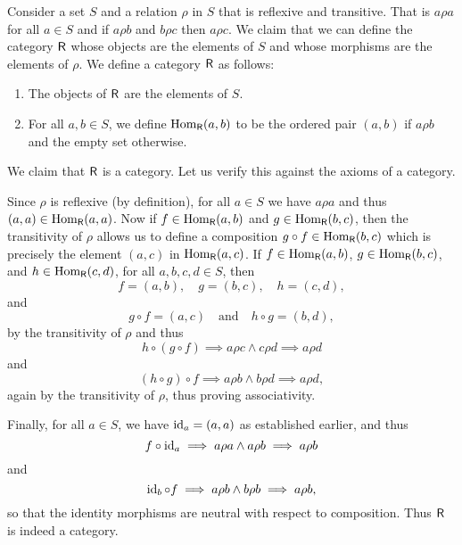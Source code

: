 \begin{example}
    Consider a set \(S\) and a relation \(\rho\) in \(S\) that is reflexive and
    transitive. That is \(a\rho a\) for all \(a \in S\) and if \(a\rho b\) and
    \(b\rho c\) then \(a\rho c\). We claim that we can define the category
    \(\mathsf{R}\) whose objects are the elements of \(S\) and whose morphisms are
    the elements of \(\rho\). We define a category \(\mathsf{R}\) as follows:
    \begin{enumerate}[label=(\alph*), itemsep=0pt]
        \item The objects of \(\mathsf{R}\) are the elements of \(S\).
        \item For all \(a, b \in S\), we define \(\operatorname{Hom}_{\mathsf{R}}(a, b)\) to be
        the ordered pair \((a, b)\) if \(a\rho b\) and the empty set otherwise.
    \end{enumerate}
    We claim that \(\mathsf{R}\) is a category. Let us verify this against the
    axioms of a category.

    Since \(\rho\) is reflexive (by definition), for all \(a \in S\) we have
    \(a\rho a\) and thus \((a, a) \in \operatorname{Hom}_{\mathsf{R}}(a, a)\). Now if \(f \in
    \operatorname{Hom}_{\mathsf{R}}(a, b)\) and \(g \in \operatorname{Hom}_{\mathsf{R}}(b, c)\), then the
    transitivity of \(\rho\) allows us to define a composition \(g \circ f \in
    \operatorname{Hom}_{\mathsf{R}}(b, c)\) which is precisely the element \((a, c)\) in
    \(\operatorname{Hom}_{\mathsf{R}}(a, c)\). If \(f \in \operatorname{Hom}_{\mathsf{R}}(a, b)\), \(g \in
    \operatorname{Hom}_{\mathsf{R}}(b, c)\), and \(h \in \operatorname{Hom}_{\mathsf{R}}(c, d)\), for all \(a,
    b, c, d \in S\), then 
    \[
        f = (a, b), \quad g = (b, c), \quad h = (c, d),
    \]
    and
    \[
        g \circ f = (a, c)\quad \text{and}\quad h \circ g = (b, d),
    \]
    by the transitivity of \(\rho\) and thus
    \[
        h \circ (g \circ f) \implies a \rho c \land c \rho d \implies a \rho d
    \]
    and
    \[
        (h \circ g) \circ f \implies a \rho b \land b \rho d \implies a \rho d,
    \]
    again by the transitivity of \(\rho\), thus proving associativity.

    Finally, for all \(a \in S\), we have \(\operatorname{id}_a = (a, a)\) as established
    earlier, and thus
    \[
        f \circ \operatorname{id}_a \implies a \rho a \land a \rho b \implies a \rho b
    \]
    and
    \[
        \operatorname{id}_b \circ f \implies a \rho b \land b \rho b \implies a \rho b,
    \]
    so that the identity morphisms are neutral with respect to composition. Thus
    \(\mathsf{R}\) is indeed a category.


\end{example}
